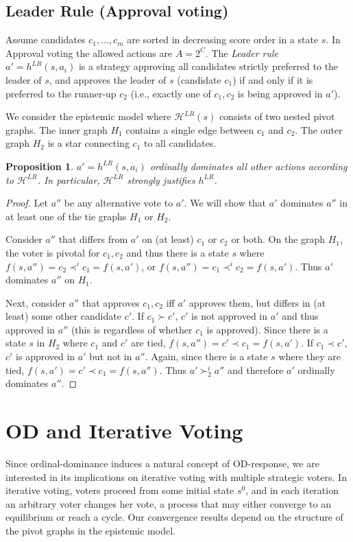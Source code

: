 \documentclass[letterpaper]{article} %
\def\calH{\mathcal{H}}
\newtheorem{proposition}[theorem]{Proposition}
\begin{document}
\subsection{Leader Rule (Approval voting)} Assume candidates $c_1,\ldots,c_m$ are sorted in decreasing score order in a state $s$. In Approval voting the allowed actions are $A=2^C$. The \emph{Leader rule}~\cite{Las09} $a'=h^{LR}(s,a_i)$ is a strategy approving all candidates strictly preferred to the leader of $s$, and approves the leader of $s$ (candidate $c_1$) if and only if it is preferred to the runner-up $c_2$ (i.e., exactly one of $c_1,c_2$ is being approved in $a'$). 

We consider the epistemic model where $\calH^{LR}(s)$ consists of two nested pivot graphs. The inner graph $H_1$ contains a single edge between $c_1$ and $c_2$. The outer graph $H_2$ is a star connecting $c_1$ to all candidates. 

\begin{proposition} $a'=h^{LR}(s,a_i)$ ordinally dominates all other actions according to $\calH^{LR}$. In particular, $\calH^{LR}$ strongly justifies $h^{LR}$.
\end{proposition}
\begin{proof}
Let $a''$ be any alternative vote to $a'$. We will show that $a'$ dominates $a''$ in at least one of the tie graphs $H_1$ or $H_2$. 

Consider $a''$ that differs from $a'$ on (at least) $c_1$ or $c_2$ or both. On the graph $H_1$, the voter is pivotal for $c_1,c_2$ and thus there is a state $s$ where $f(s,a'')=c_2 \prec^{i} c_1 = f(s,a')$, or $f(s,a'')=c_1 \prec^{i} c_2 = f(s,a')$. Thus $a'$ dominates $a''$ on $H_1$. 

Next, consider $a''$ that approves $c_1,c_2$ iff $a'$ approves them, but differs in (at least) some other candidate $c'$. If $c_1\succ c'$, $c'$ is not approved in $a'$ and thus approved in $a''$ (this is regardless of whether $c_1$ is approved). Since there is a state $s$ in $H_2$ where $c_{1}$ and $c'$ are tied, $f(s,a'')=c' \prec c_1 = f(s,a')$. If $c_1\prec c'$, $c'$ is approved in $a'$ but not in $a''$. Again, since there is a state $s$ where they are tied, $f(s,a')=c' \prec c_1 = f(s,a'')$. 
Thus $a' \succ^i_2 a''$ and therefore $a'$ ordinally dominates $a''$.
\end{proof}

\section{OD and Iterative Voting}
Since ordinal-dominance induces a natural concept of OD-response, we are interested in its implications on iterative voting with multiple strategic voters.
In iterative voting, voters proceed from some initial state $s^{0}$, and in each iteration an arbitrary voter changes her vote, a process that may either converge to an equilibrium or reach a cycle. Our convergence results depend on the structure of the pivot graphs in the epistemic model.
\end{document}
